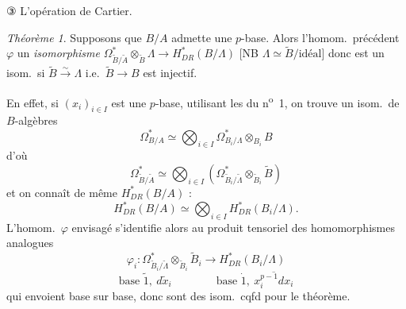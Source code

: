 \documentclass[11pt,a4paper]{article}
\begin{document}
③ L'opération de Cartier.

\emph{Théorème 1}. Supposons que $B/A$ admette une $p$-base. Alors l'homom.\ précédent $\varphi$   un \emph{isomorphisme} $\Omega^{*}_{\widetilde{B}/\widetilde{A}} \otimes_{\widetilde{B}} \Lambda \to H^{*}_{DR}(B/\Lambda)$ [NB $\Lambda \simeq \widetilde{B}/\text{idéal}$] donc est un isom.\ si $\widetilde{B} \xrightarrow{\sim} \Lambda$ i.e.\ $\widetilde{B} \to B$ est injectif.

En effet, si $(x_{i})_{i \in I}$ est une $p$-base, utilisant les  du n\textsuperscript{o}~1, on trouve un isom.\ de $B$-algèbres
\[
\Omega^{*}_{B/A} \simeq \bigotimes_{i \in I} \Omega^{*}_{B_{i}/\Lambda} \otimes_{B_{i}} B
\]
d'où 
\[
\Omega^{*}_{\widetilde{B}/\widetilde{A}} \simeq \bigotimes_{i \in I} (\Omega^{*}_{\widetilde{B}_{i}/\widetilde{\Lambda}} \otimes_{\widetilde{B}_{i}} \widetilde{B})
\]
et on connaît de même    $H^{*}_{DR}(B/A)$ :
\[
H^{*}_{DR}(B/A) \simeq \bigotimes_{i \in I} H^{*}_{DR}(B_{i}/\Lambda) .
\]
L'homom.\ $\varphi$ envisagé s'identifie alors au produit tensoriel des homomorphismes analogues 
\[
\varphi_{i} : \Omega^{*}_{\widetilde{B}_{i}/\widetilde{\Lambda}} \otimes_{\widetilde{B}_{i}} \widetilde{B}_{i} \to H^{*}_{DR}(B_{i}/\Lambda)
\]
\[
\text{base } \widetilde{1},\ d\widetilde{x}_{i} \qquad\qquad \text{base } \dot{1},\ \overline{x_{i}^{p-1}dx_{i}}
\]
qui envoient base sur base, donc sont des isom.\ cqfd pour le théorème.


\end{document}
